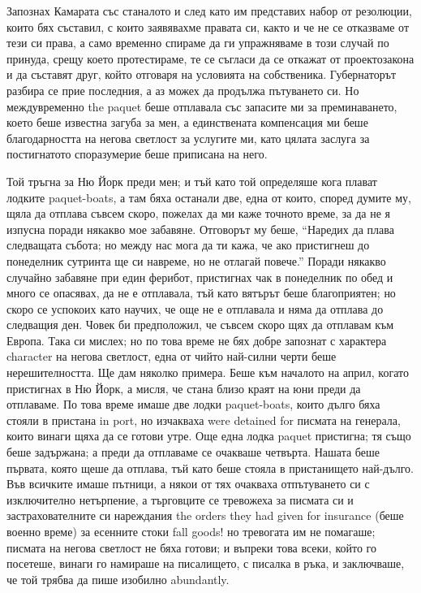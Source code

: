 \documentclass[12pt]{book}
\begin{document}
Запознах Камарата със станалото и след като им представих набор от резолюции, които бях съставил, с които заявявахме правата си, както и че не се отказваме от тези си права, а само временно спираме да ги упражняваме в този случай по принуда, срещу което протестираме, те се съгласи да се откажат от проектозакона и да съставят друг, който отговаря на условията на собственика. Губернаторът разбира се прие последния, а аз можех да продължа пътуването си. Но междувременно the paquet беше отплавала със запасите ми за преминаването, което беше известна загуба за мен, а единствената компенсация ми беше благодарността на негова светлост за услугите ми, като цялата заслуга за постигнатото споразумерие беше приписана на него.

Той тръгна за Ню Йорк преди мен; и тъй като той определяше кога плават лодките paquet-boats, а там бяха останали две, една от които, според думите му, щяла да отплава съвсем скоро, пожелах да ми каже точното време, за да не я изпусна поради някакво мое забавяне. Отговорът му беше, “Наредих да плава следващата събота; но между нас мога да ти кажа, че ако пристигнеш до понеделник сутринта ще си навреме, но не отлагай повече.” Поради някакво случайно забавяне при един ферибот, пристигнах чак   в понеделник по обед и много се опасявах, да не е отплавала, тъй като вятърът беше благоприятен; но скоро се успокоих като научих, че още не е отплавала и няма да отплава до следващия ден. Човек би предположил, че съвсем скоро щях да отплавам към Европа. Така си мислех; но по това време не бях добре запознат с характера character на негова светлост, една от чийто най-силни черти беше нерешителността. Ще дам няколко примера. Беше към началото на април, когато пристигнах в Ню Йорк, а мисля, че стана близо краят на юни преди да отплаваме. По това време имаше две лодки paquet-boats, които дълго бяха стояли в пристана in port, но изчакваха were detained for писмата на генерала, които винаги щяха да се готови утре. Още една лодка paquet пристигна; тя също беше задържана; а преди да отплаваме се очакваше четвърта. Нашата беше първата, която щеше да отплава, тъй като беше стояла в пристанището най-дълго. Във всичките имаше пътници, а някои от тях очакваха отпътуването си с изключително нетърпение, а търговците се тревожеха за писмата си и застрахователните си нареждания the orders they had given for insurance (беше военно време) за есенните стоки fall goods! но тревогата им не помагаше; писмата на негова светлост не бяха готови; и въпреки това всеки, който го посетеше, винаги го намираше на писалището, с писалка в ръка, и заключваше, че той трябва да пише изобилно abundantly.
\end{document}
